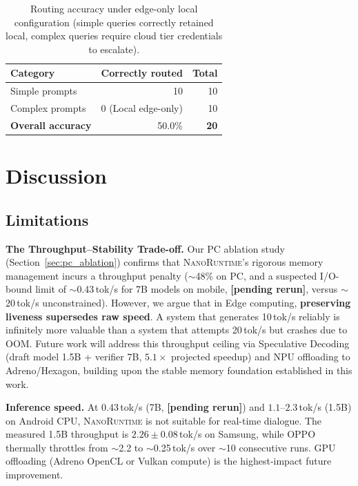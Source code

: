 \documentclass[11pt]{article}
\newcommand{\nanort}{\textsc{NanoRuntime}}
\begin{document}
\begin{table}[h]
\centering
\caption{Routing accuracy under edge-only local configuration (simple queries correctly retained local, complex queries require cloud tier credentials to escalate).}
\label{tab:routing_acc}
\begin{tabular}{lrr}
\toprule
Category & Correctly routed & Total \\
\midrule
Simple prompts & 10 & 10 \\
Complex prompts & 0 (Local edge-only) & 10 \\
\textbf{Overall accuracy} & 50.0\% & \textbf{20} \\
\bottomrule
\end{tabular}
\end{table}

\section{Discussion}
\label{sec:discussion}

\subsection{Limitations}

\textbf{The Throughput--Stability Trade-off.}
Our PC ablation study (Section~\ref{sec:pc_ablation}) confirms that
\nanort{}'s rigorous memory management incurs a throughput penalty
($\sim$48\% on PC, and a suspected I/O-bound limit of $\sim$0.43\,tok/s for
7B models on mobile, \textbf{[pending rerun]}, versus $\sim$20\,tok/s
unconstrained).
However, we argue that in Edge computing, \textbf{preserving liveness
supersedes raw speed}. A system that generates 10\,tok/s reliably
is infinitely more valuable than a system that attempts 20\,tok/s
but crashes due to OOM. Future work will address this throughput
ceiling via Speculative Decoding (draft model 1.5B + verifier 7B,
$5.1\times$ projected speedup) and NPU offloading to Adreno/Hexagon,
building upon the stable memory foundation established in this work.

\textbf{Inference speed.}
At 0.43\,tok/s (7B, \textbf{[pending rerun]}) and $1.1$--$2.3$\,tok/s (1.5B) on Android CPU,
\nanort{} is not suitable for real-time dialogue. The measured 1.5B throughput
is $2.26\pm0.08$\,tok/s on Samsung, while OPPO thermally throttles from
$\sim$2.2 to $\sim$0.25\,tok/s over $\sim$10 consecutive runs. GPU offloading
(Adreno OpenCL or Vulkan compute) is the highest-impact future improvement.
\end{document}
